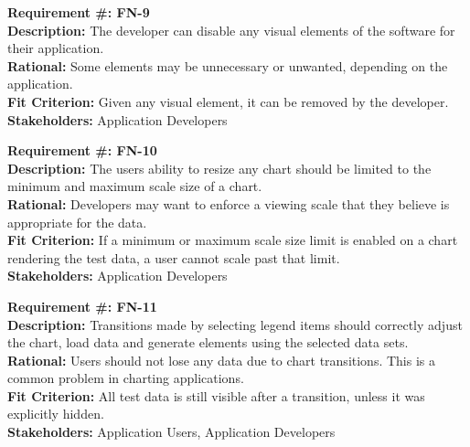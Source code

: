 \documentclass[12pt, titlepage]{article}
\begin{document}
\begin{flushleft}
\textbf{Requirement \#: FN-9} \\
\textbf{Description:} The developer can disable any visual elements of the software for their application. \\
\textbf{Rational:} Some elements may be unnecessary or unwanted, depending on the application. \\
\textbf{Fit Criterion:} Given any visual element, it can be removed by the developer. \\
\textbf{Stakeholders:} Application Developers \\
\end{flushleft}
\begin{flushleft}
\textbf{Requirement \#: FN-10} \\
\textbf{Description:} The users ability to resize any chart should be limited to the minimum and maximum scale size of a chart.  \\
\textbf{Rational:} Developers may want to enforce a viewing scale that they believe is appropriate for the data. \\
\textbf{Fit Criterion:} If a minimum or maximum scale size limit is enabled on a chart rendering the test data, a user cannot scale past that limit. \\
\textbf{Stakeholders:} Application Developers \\
\end{flushleft}
\begin{flushleft}
\textbf{Requirement \#: FN-11} \\
\textbf{Description:} Transitions made by selecting legend items should correctly adjust the chart, load data and generate elements using the selected data sets. \\
\textbf{Rational:} Users should not lose any data due to chart transitions. This is a common problem in charting applications. \\
\textbf{Fit Criterion:} All test data is still visible after a transition, unless it was explicitly hidden. \\
\textbf{Stakeholders:} Application Users, Application Developers \\
\end{flushleft}

\end{document}
